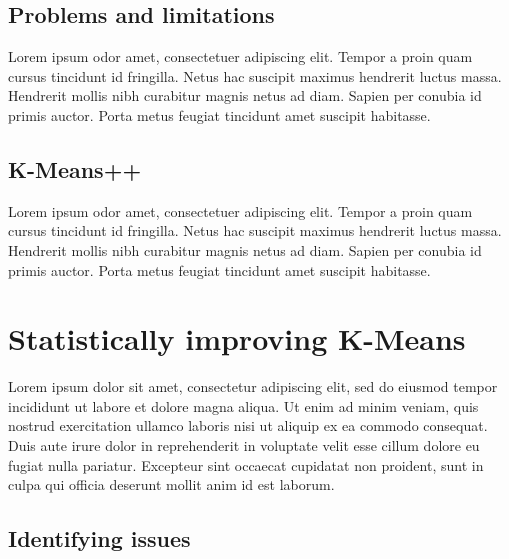 \documentclass[10pt,twocolumn,letterpaper]{article}
\begin{document}

\subsection{Problems and limitations}\label{subsec:problems-and-limitations}

Lorem ipsum odor amet, consectetuer adipiscing elit. Tempor a proin quam cursus
tincidunt id fringilla. Netus hac suscipit maximus hendrerit luctus massa.
Hendrerit mollis nibh curabitur magnis netus ad diam. Sapien per conubia id
primis auctor. Porta metus feugiat tincidunt amet suscipit habitasse.


\subsection{K-Means++}\label{subsec:k-means++}

Lorem ipsum odor amet, consectetuer adipiscing elit. Tempor a proin quam cursus
tincidunt id fringilla. Netus hac suscipit maximus hendrerit luctus massa.
Hendrerit mollis nibh curabitur magnis netus ad diam. Sapien per conubia id
primis auctor. Porta metus feugiat tincidunt amet suscipit habitasse.


\section{Statistically improving K-Means}\label{sec:statistically-improving-k-means}

Lorem ipsum dolor sit amet, consectetur adipiscing elit, sed do eiusmod tempor
incididunt ut labore et dolore magna aliqua. Ut enim ad minim veniam, quis
nostrud exercitation ullamco laboris nisi ut aliquip ex ea commodo consequat.
Duis aute irure dolor in reprehenderit in voluptate velit esse cillum dolore eu
fugiat nulla pariatur. Excepteur sint occaecat cupidatat non proident, sunt in
culpa qui officia deserunt mollit anim id est laborum.


\subsection{Identifying issues}\label{subsec:identifying-issues}
\end{document}

